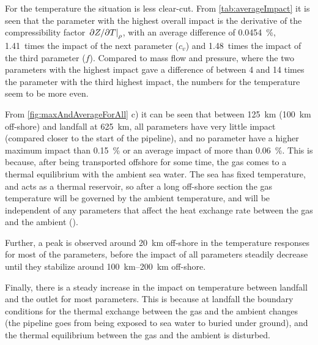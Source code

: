 % 

For the temperature the situation is less clear-cut. From \cref{tab:averageImpact} it is seen that the parameter with the highest overall impact is the derivative of the compressibility factor $\eval{\partial Z/\partial T}_\rho$, with an average difference of \SI{0.0454}{\percent}, 1.41~times the impact of the next parameter ($c_v$) and 1.48~times the impact of the third parameter ($f$). Compared to mass flow and pressure, where the two parameters with the highest impact gave a difference of between 4 and 14 times the parameter with the third highest impact, the numbers for the temperature seem to be more even.

From \cref{fig:maxAndAverageForAll} c) it can be seen that between \SI{125}{\kilo\meter} (\SI{100}{\kilo\meter} off-shore) and landfall at \SI{625}{\kilo\meter}, all parameters have very little impact (compared closer to the start of the pipeline), and no parameter have a higher maximum impact than \SI{0.15}{\percent} or an average impact of more than \SI{0.06}{\percent}. %
This is because, after being transported offshore for some time, the gas comes to a thermal equilibrium with the ambient sea water. The sea has fixed temperature, and acts as a thermal reservoir, so after a long off-shore section the gas temperature will be governed by the ambient temperature, and will be independent of any parameters that affect the heat exchange rate between the gas and the ambient ().

Further, a peak is observed around \SI{20}{\kilo\meter} off-shore in the temperature responses for most of the parameters, before the impact of all parameters steadily decrease until they stabilize around \SIrange{100}{200}{\kilo\meter} off-shore. 

Finally, there is a steady increase in the impact on temperature between landfall and the outlet for most parameters. This is because at landfall the boundary conditions for the thermal exchange between the gas and the ambient changes (the pipeline goes from being exposed to sea water to buried under ground), and the thermal equilibrium between the gas and the ambient is disturbed. %


